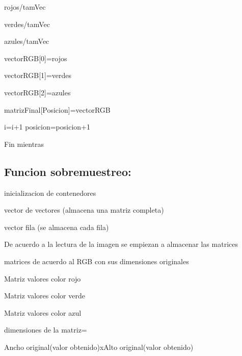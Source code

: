\documentclass{article}
\begin{document}
\hspace{0.5cm}rojos/tamVec

\hspace{0.5cm}verdes/tamVec

\hspace{0.5cm}azules/tamVec

\hspace{0.5cm}vectorRGB[0]=rojos

\hspace{0.5cm}vectorRGB[1]=verdes

\hspace{0.5cm}vectorRGB[2]=azules

\hspace{0.5cm}matrizFinal[Posicion]=vectorRGB

\hspace{0.5cm}i=i+1
\hspace{0.5cm}posicion=posicion+1

Fin mientras

\subsection{Funcion sobremuestreo:}

\hspace{0.5cm}inicializacion de contenedores

\hspace{0.5cm}vector de vectores (almacena una matriz completa)

\hspace{0.5cm}vector fila (se almacena cada fila)

\hspace{0.5cm}De acuerdo a la lectura de la imagen se empiezan a almacenar las matrices

\hspace{0.5cm}matrices de acuerdo al RGB con sus dimensiones originales

\hspace{0.5cm}Matriz valores color rojo

\hspace{0.5cm}Matriz valores color verde

\hspace{0.5cm}Matriz valores color azul

\hspace{0.5cm}dimensiones de la matriz= 

\hspace{0.5cm}Ancho original(valor obtenido)xAlto original(valor obtenido)
\end{document}
